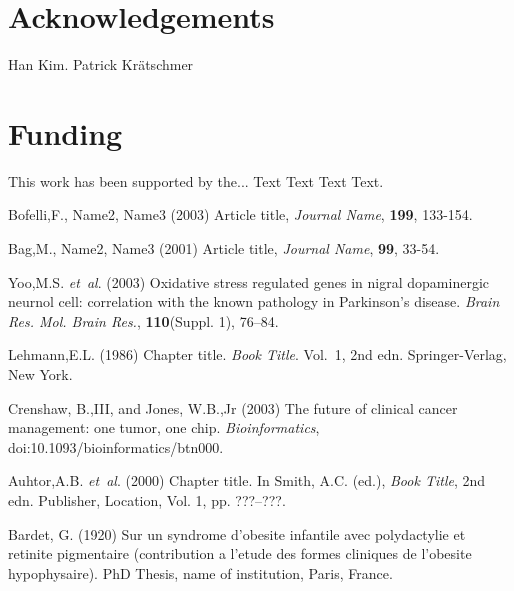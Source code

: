 \documentclass{bioinfo}
\begin{document}
\section*{Acknowledgements}

Han Kim. Patrick Kr{\"a}tschmer

\section*{Funding}

This work has been supported by the... Text Text  Text Text.\vspace*{-12pt}

%
%
%
%
%
%
%
%
%


\begin{thebibliography}{}

Bofelli,F., Name2, Name3 (2003) Article title, {\it Journal Name}, {\bf 199}, 133-154.

Bag,M., Name2, Name3 (2001) Article title, {\it Journal Name}, {\bf 99}, 33-54.

Yoo,M.S. \textit{et~al}. (2003) Oxidative stress regulated genes
in nigral dopaminergic neurnol cell: correlation with the known
pathology in Parkinson's disease. \textit{Brain Res. Mol. Brain
Res.}, \textbf{110}(Suppl. 1), 76--84.

Lehmann,E.L. (1986) Chapter title. \textit{Book Title}. Vol.~1, 2nd edn. Springer-Verlag, New York.

Crenshaw, B.,III, and Jones, W.B.,Jr (2003) The future of clinical
cancer management: one tumor, one chip. \textit{Bioinformatics},
doi:10.1093/bioinformatics/btn000.

Auhtor,A.B. \textit{et~al}. (2000) Chapter title. In Smith, A.C.
(ed.), \textit{Book Title}, 2nd edn. Publisher, Location, Vol. 1, pp.
???--???.

Bardet, G. (1920) Sur un syndrome d'obesite infantile avec
polydactylie et retinite pigmentaire (contribution a l'etude des
formes cliniques de l'obesite hypophysaire). PhD Thesis, name of
institution, Paris, France.

\end{thebibliography}
\end{document}
